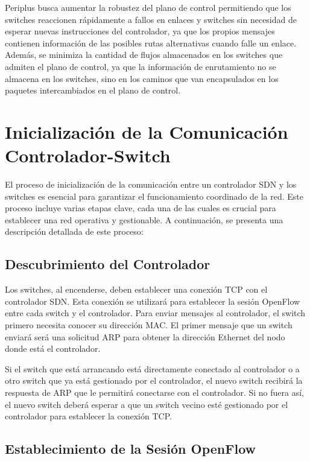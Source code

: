 \documentclass[a4paper, 12pt]{book}
\begin{document}
	Periplus busca aumentar la robustez del plano de control permitiendo que los switches reaccionen rápidamente a fallos en enlaces y switches sin necesidad de esperar nuevas instrucciones del controlador, ya que los propios mensajes contienen información de las posibles rutas alternativas cuando falle un enlace.
	Además, se minimiza la cantidad de flujos almacenados en los switches que admiten el plano de control, ya que la información de enrutamiento no se almacena en los switches, sino en los caminos que van encapsulados en los paquetes intercambiados en el plano de control.
	
	
	\section{Inicialización de la Comunicación Controlador-Switch}
	
	El proceso de inicialización de la comunicación entre un controlador SDN y los switches es esencial para garantizar el funcionamiento coordinado de la red. Este proceso incluye varias etapas clave, cada una de las cuales es crucial para establecer una red operativa y gestionable. A continuación, se presenta una descripción detallada de este proceso:
	
	\subsection{Descubrimiento del Controlador}
	
		Los switches, al encenderse, deben establecer una conexión TCP con el controlador SDN. Esta conexión se utilizará para establecer la sesión OpenFlow entre cada switch y el controlador.
		Para enviar mensajes al controlador, el switch primero necesita conocer su dirección MAC. El primer mensaje que un switch enviará será una solicitud ARP para obtener la dirección Ethernet del nodo donde está el controlador.

	Si el switch que está arrancando está directamente conectado al controlador o a otro
	switch que ya está gestionado por el controlador, el nuevo switch recibirá la respuesta
	de ARP que le permitirá conectarse 	con el controlador. Si no fuera así, el nuevo switch
	deberá esperar 	a que un  switch vecino	esté gestionado	por el	controlador para establecer la conexión TCP.
	
	\subsection{Establecimiento de la Sesión OpenFlow}
	
\end{document}
